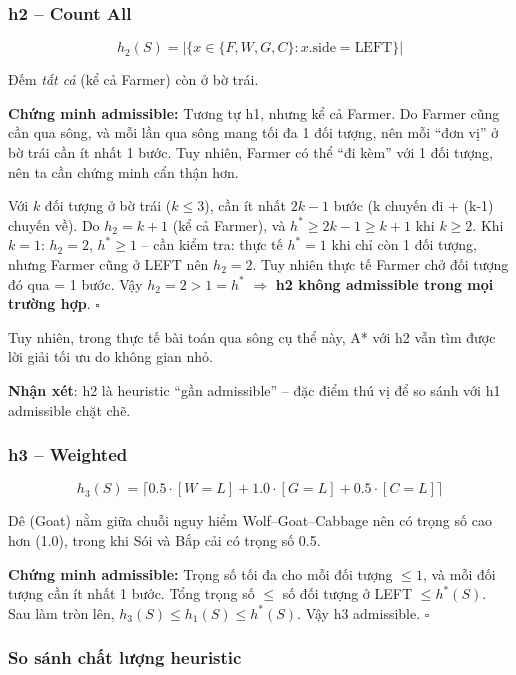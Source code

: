 \documentclass[a4paper,12pt]{article}
\begin{document}
\subsubsection{h2 -- Count All}

\[
    h_2(S) = |\{x \in \{F, W, G, C\} : x.\text{side} = \text{LEFT}\}|
\]

Đếm \textit{tất cả} (kể cả Farmer) còn ở bờ trái.

\textbf{Chứng minh admissible:} Tương tự h1, nhưng kể cả Farmer. Do Farmer cũng cần qua sông, và mỗi lần qua sông mang tối đa 1 đối tượng, nên mỗi ``đơn vị'' ở bờ trái cần ít nhất 1 bước. Tuy nhiên, Farmer có thể ``đi kèm'' với 1 đối tượng, nên ta cần chứng minh cẩn thận hơn.

Với $k$ đối tượng ở bờ trái ($k \leq 3$), cần ít nhất $2k - 1$ bước (k chuyến đi + (k-1) chuyến về). Do $h_2 = k + 1$ (kể cả Farmer), và $h^* \geq 2k - 1 \geq k + 1$ khi $k \geq 2$. Khi $k = 1$: $h_2 = 2$, $h^* \geq 1$ -- cần kiểm tra: thực tế $h^* = 1$ khi chỉ còn 1 đối tượng, nhưng Farmer cũng ở LEFT nên $h_2 = 2$. Tuy nhiên thực tế Farmer chở đối tượng đó qua = 1 bước. Vậy $h_2 = 2 > 1 = h^*$ $\Rightarrow$ \textbf{h2 không admissible trong mọi trường hợp}. $\square$

Tuy nhiên, trong thực tế bài toán qua sông cụ thể này, A* với h2 vẫn tìm được lời giải tối ưu do không gian nhỏ.

\textbf{Nhận xét}: h2 là heuristic ``gần admissible'' -- đặc điểm thú vị để so sánh với h1 admissible chặt chẽ.

\subsubsection{h3 -- Weighted}

\[
    h_3(S) = \lceil 0.5 \cdot [W = L] + 1.0 \cdot [G = L] + 0.5 \cdot [C = L] \rceil
\]

Dê (Goat) nằm giữa chuỗi nguy hiểm Wolf--Goat--Cabbage nên có trọng số cao hơn (1.0), trong khi Sói và Bắp cải có trọng số 0.5.

\textbf{Chứng minh admissible:} Trọng số tối đa cho mỗi đối tượng $\leq 1$, và mỗi đối tượng cần ít nhất 1 bước. Tổng trọng số $\leq$ số đối tượng ở LEFT $\leq h^*(S)$. Sau làm tròn lên, $h_3(S) \leq h_1(S) \leq h^*(S)$. Vậy h3 admissible. $\square$

\subsubsection{So sánh chất lượng heuristic}
\end{document}
